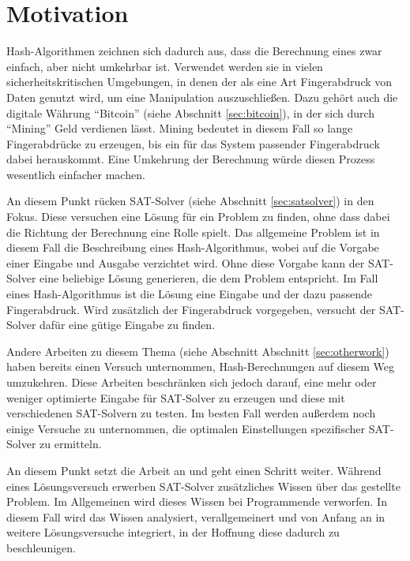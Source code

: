 \section{Motivation}

Hash-Algorithmen zeichnen sich dadurch aus, dass die Berechnung eines  zwar einfach, aber nicht umkehrbar ist.
Verwendet werden sie in vielen sicherheitskritischen Umgebungen, in denen der  als eine Art Fingerabdruck
von Daten genutzt wird, um eine Manipulation auszuschließen. Dazu gehört auch die digitale Währung "`Bitcoin"' (siehe Abschnitt
\ref{sec:bitcoin}), in der sich durch "`Mining"' Geld verdienen lässt. Mining bedeutet in diesem Fall so lange Fingerabdrücke
zu erzeugen, bis ein für das System passender Fingerabdruck dabei herauskommt. Eine Umkehrung der Berechnung würde diesen
Prozess wesentlich einfacher machen.

An diesem Punkt rücken SAT-Solver (siehe Abschnitt \ref{sec:satsolver}) in den Fokus. Diese versuchen eine Lösung für ein
Problem zu finden, ohne dass dabei die Richtung der Berechnung eine Rolle spielt. Das allgemeine Problem ist in diesem Fall
die Beschreibung eines Hash-Algorithmus, wobei auf die Vorgabe einer Eingabe und Ausgabe verzichtet wird. Ohne diese Vorgabe
kann der SAT-Solver eine beliebige Lösung generieren, die dem Problem entspricht. Im Fall eines Hash-Algorithmus ist die Lösung
eine Eingabe und der dazu passende Fingerabdruck. Wird zusätzlich der Fingerabdruck vorgegeben, versucht der SAT-Solver dafür
eine gütige Eingabe zu finden.

Andere Arbeiten zu diesem Thema (siehe Abschnitt Abschnitt \ref{sec:otherwork}) haben bereits einen Versuch unternommen,
Hash-Berechnungen auf diesem Weg umzukehren. Diese Arbeiten beschränken sich jedoch darauf, eine mehr oder weniger optimierte
Eingabe für SAT-Solver zu erzeugen und diese mit verschiedenen SAT-Solvern zu testen. Im besten Fall werden außerdem noch
einige Versuche zu unternommen, die optimalen Einstellungen spezifischer SAT-Solver zu ermitteln.

An diesem Punkt setzt die Arbeit an und geht einen Schritt weiter. Während eines Lösungsversuch erwerben SAT-Solver zusätzliches
Wissen über das gestellte Problem. Im Allgemeinen wird dieses Wissen bei Programmende verworfen. In diesem Fall wird das Wissen
analysiert, verallgemeinert und von Anfang an in weitere Lösungsversuche integriert, in der Hoffnung diese dadurch zu beschleunigen.